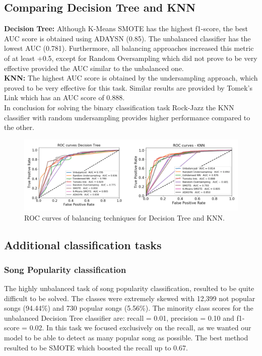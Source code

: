 \subsection{Comparing Decision Tree and KNN}
\textbf{Decision Tree:}
Although K-Means SMOTE has the highest f1-score, the best AUC score is obtained using ADAYSN (0.85). The unbalanced classifier has the lowest AUC (0.781). Furthermore, all balancing approaches increased this metric of at least +0.5, except for Random Oversampling which did not prove to be very effective provided the AUC similar to the unbalanced one.\\
\textbf{KNN:} The highest AUC score is obtained by the undersampling approach, which proved to be very effective for this task. Similar results are provided by Tomek's Link which has an AUC score of 0.888.
\\
In conclusion for solving the binary classification task Rock-Jazz the KNN classifier with random undersampling provides higher performance compared to the other.

\begin{figure}[h]
  \centering 
  \includegraphics[width=0.95\linewidth]{images/imb-learn_roc-curves_DT-KNN.png}
  \caption{ROC curves of balancing techniques for Decision Tree and KNN.}
\end{figure}

\subsection{Additional classification tasks}
\subsubsection{Song Popularity classification}
The highly unbalanced task of song popularity classification, resulted to be quite difficult to be solved. The classes were extremely skewed with 12,399 not popular songs (94.44\%) and 730 popular songs (5.56\%). The minority class scores for the unbalanced Decision Tree classifier are: recall = 0.01, precision = 0.10 and f1-score = 0.02. In this task we focused exclusively on the recall, as we wanted our model to be able to detect as many popular song as possible. The best method resulted to be SMOTE which boosted the recall up to 0.67.  
